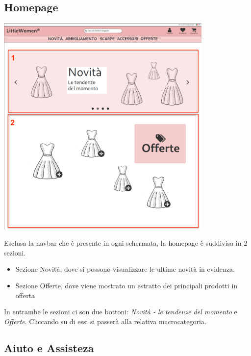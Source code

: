 \documentclass[12pt,a4paper]{report}
\begin{document}
\subsection{Homepage}
\begin{center}
\includegraphics[width=0.80\textwidth]{"Images Latex/Immagini Wireframe/Desktop/1 - Homepage"}
\end{center}
Esclusa la navbar che è presente in ogni schermata, la homepage è suddivisa in 2 sezioni.
\begin{itemize}
  \item Sezione Novità, dove si possono visualizzare le ultime novità in evidenza.
  \item Sezione Offerte, dove viene mostrato un estratto dei principali prodotti in offerta
\end{itemize}
In entrambe le sezioni ci son due bottoni:  \textit{Novità - le tendenze del momento} e \textit{Offerte}. Cliccando su di essi si passerà alla relativa macrocategoria.
\subsection{Aiuto e Assisteza}
\end{document}

